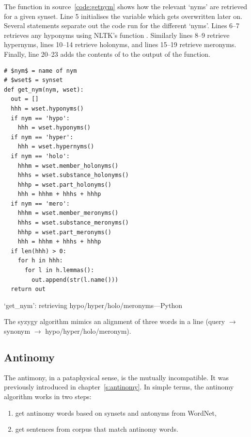The  function in source~\ref{code:getnym} shows how the relevant `nyms' are retrieved for a given synset. Line 5 initialises the variable  which gets overwritten later on. Several  statements separate out the code run for the different `nyms'. Lines 6--7 retrieves any hyponyms using \ac{NLTK}'s  function . Similarly lines 8--9 retrieve hypernyms, lines 10--14 retrieve holonyms, and lines 15--19 retrieve meronyms. Finally, line 20--23 adds the contents of  to the output of the function.

\begin{listing}[!htbp] %
  \begin{verbatim}
# $nym$ = name of nym
# $wset$ = synset
def get_nym(nym, wset):
  out = []
  hhh = wset.hyponyms()
  if nym == 'hypo':
    hhh = wset.hyponyms()
  if nym == 'hyper':
    hhh = wset.hypernyms()
  if nym == 'holo':
    hhhm = wset.member_holonyms()
    hhhs = wset.substance_holonyms()
    hhhp = wset.part_holonyms()
    hhh = hhhm + hhhs + hhhp
  if nym == 'mero':
    hhhm = wset.member_meronyms()
    hhhs = wset.substance_meronyms()
    hhhp = wset.part_meronyms()
    hhh = hhhm + hhhs + hhhp
  if len(hhh) > 0:
    for h in hhh:
      for l in h.lemmas():
        out.append(str(l.name()))
  return out
  \end{verbatim}
\caption[`get\_nym' function---Python]{`get\_nym': retrieving hypo/hyper/holo/meronyms---Python}
\label{code:getnym}
\end{listing}

The syzygy algorithm mimics an alignment of three words in a line (query $\to$ synonym $\to$ hypo/hyper/holo/meronym).


\subsection{Antinomy}
\label{s:antinomyalgo}

The antimony, in a pataphysical sense, is the mutually incompatible. It was previously introduced in chapter~\ref{s:antinomy}. In simple terms, the antinomy algorithm works in two steps:

\begin{enumerate}
  \item get antinomy words based on synsets and antonyms from WordNet,
  \item get sentences from corpus that match antinomy words.
\end{enumerate}

